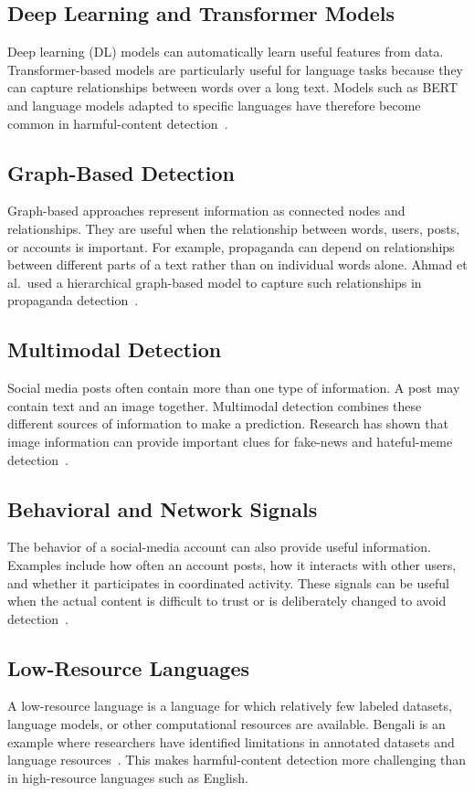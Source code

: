 \subsection{Deep Learning and Transformer Models}
Deep learning (DL) models can automatically learn useful features from data.
Transformer-based models are particularly useful for language tasks because they
can capture relationships between words over a long text. Models such as BERT and
language models adapted to specific languages have therefore become common in
harmful-content detection~\cite{duridi2025,lora2023,hasan2026}.

\subsection{Graph-Based Detection}
Graph-based approaches represent information as connected nodes and relationships.
They are useful when the relationship between words, users, posts, or accounts is
important. For example, propaganda can depend on relationships between different
parts of a text rather than on individual words alone. Ahmad et al.\ used a
hierarchical graph-based model to capture such relationships in propaganda
detection~\cite{ahmad2025}.

\subsection{Multimodal Detection}
Social media posts often contain more than one type of information. A post may
contain text and an image together. Multimodal detection combines these different
sources of information to make a prediction. Research has shown that image
information can provide important clues for fake-news and hateful-meme
detection~\cite{lin2024,hee2022}.

\subsection{Behavioral and Network Signals}
The behavior of a social-media account can also provide useful information.
Examples include how often an account posts, how it interacts with other users, and
whether it participates in coordinated activity. These signals can be useful when
the actual content is difficult to trust or is deliberately changed to avoid
detection~\cite{declerck2024,sela2025,schneider2026}.

\subsection{Low-Resource Languages}
A low-resource language is a language for which relatively few labeled datasets,
language models, or other computational resources are available. Bengali is an
example where researchers have identified limitations in annotated datasets and
language resources~\cite{lora2023,hasan2026,romim2022}. This makes harmful-content
detection more challenging than in high-resource languages such as English.

